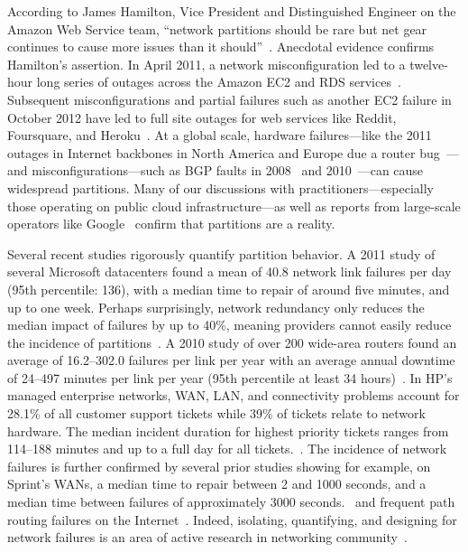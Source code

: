 According to James Hamilton, Vice President and Distinguished Engineer
on the Amazon Web Service team, ``network partitions should be rare
but net gear continues to cause more issues than it
should''~\cite{hamilton-partitions}. Anecdotal evidence confirms
Hamilton's assertion. In April 2011, a network misconfiguration led to
a twelve-hour long series of outages across the Amazon EC2 and RDS
services~\cite{amazon-netpartition}. Subsequent misconfigurations and
partial failures such as another EC2 failure in October 2012 have led
to full site outages for web services like Reddit, Foursquare, and
Heroku~\cite{ec2-downsites}. At a global scale, hardware
failures---like the 2011 outages in Internet backbones in North
America and Europe due a router bug~\cite{juniper-partition}---and
misconfigurations---such as BGP faults in 2008~\cite{pakistan-youtube}
and 2010~\cite{research-experiment-partition}---can cause widespread
partitions. Many of our discussions with practitioners---especially
those operating on public cloud infrastructure---as well as reports
from large-scale operators like Google~\cite{dean-keynote} confirm
that partitions are a reality.

Several recent studies rigorously quantify partition behavior. A 2011
study of several Microsoft datacenters found a mean of 40.8 network
link failures per day (95th percentile: 136), with a median time to
repair of around five minutes, and up to one week. Perhaps
surprisingly, network redundancy only reduces the median impact of
failures by up to 40\%, meaning providers cannot easily reduce the
incidence of partitions~\cite{sigcomm-dc}. A 2010 study of over 200
wide-area routers found an average of 16.2--302.0 failures per link
per year with an average annual downtime of 24--497 minutes per link
per year (95th percentile at least 34 hours)~\cite{sigcomm-wan}. In
HP's managed enterprise networks, WAN, LAN, and connectivity problems
account for 28.1\% of all customer support tickets while 39\% of
tickets relate to network hardware.  The median incident duration for
highest priority tickets ranges from 114--188 minutes and up to a full
day for all tickets.~\cite{turner2012failure}. The incidence of
network failures is further confirmed by several prior studies showing
for example, on Sprint's WANs, a median time to repair between 2 and
1000 seconds, and a median time between failures of approximately 3000
seconds.~\cite{ip-backbone-failures} and frequent path routing
failures on the Internet~\cite{labovitz-failures}. Indeed, isolating,
quantifying, and designing for network failures is an area of active
research in networking community~\cite{surviving-failures-bodik,
  uw-failure-networks}.

